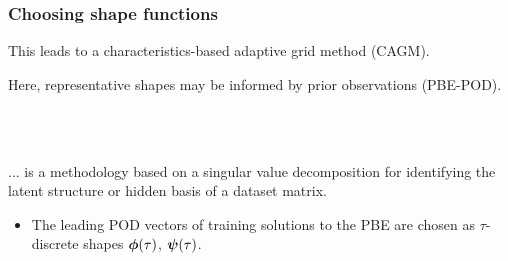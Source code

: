 \documentclass[10pt,xcolor=dvipsnames]{beamer}
\newcommand*{\itemskip}{0.25\baselineskip}
\renewcommand{\cite}{\parencite}
\begin{document}
\begin{frame}[t]

  \frametitle{Choosing shape functions}
  
  \vspace{-0.75\baselineskip}
  \begin{minipage}[t]{0.45\columnwidth}\vskip0pt
  \begin{center}
  \resizebox{0.85\columnwidth}{!}{}
  \end{center}
  \justifying This leads to a characteristics-based adaptive grid method (CAGM).
  \end{minipage}\hfill
  \begin{minipage}[t]{0.45\columnwidth}\vskip0pt
  \begin{center}
  \resizebox{0.85\columnwidth}{!}{}
  \end{center}
  \justifying Here, representative shapes may be informed by prior observations (PBE-POD).
  \end{minipage}\\
  \vspace{\baselineskip}

   \cite{Holmes2012}\\
  \justifying ... is a methodology based on a singular value decomposition for identifying the latent structure or hidden basis of a dataset matrix.
  \begin{itemize}
  \vspace{\itemskip}
  \item The leading POD vectors of training solutions to the PBE are chosen as $\tau$-discrete shapes ${\boldsymbol \phi}(\tau)$, ${\boldsymbol \psi}(\tau)$.
  \end{itemize}

\end{frame}

\end{document}
